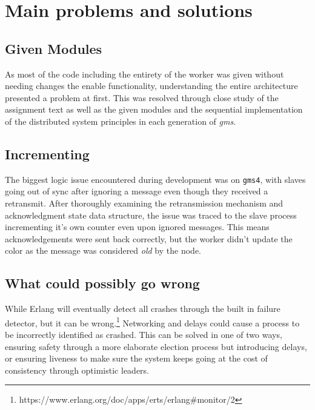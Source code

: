 \documentclass[a4paper, 11pt]{article}
\begin{document}
\section{Main problems and solutions}

\subsection{Given Modules}

As most of the code including the entirety of the worker was given without needing changes the enable functionality, understanding the entire architecture presented a problem at first.
This was resolved through close study of the assignment text as well as the given modules and the sequential implementation of the distributed system principles in each generation of \textit{gms}.

\subsection{Incrementing}

The biggest logic issue encountered during development was on \texttt{gms4}, with slaves going out of sync after ignoring a message even though they received a retransmit.
After thoroughly examining the retransmission mechanism and acknowledgment state data structure, the issue was traced to the slave process incrementing it's own counter even upon ignored messages.
This means acknowledgements were sent back correctly, but the worker didn't update the color as the message was considered \textit{old} by the node.

\subsection{What could possibly go wrong}


While Erlang will eventually detect all crashes through the built in failure detector, but it can be wrong.\footnote{https://www.erlang.org/doc/apps/erts/erlang\#monitor/2}
Networking and delays could cause a process to be incorrectly identified as crashed.
This can be solved in one of two ways, ensuring safety through a more elaborate election process but introducing delays,
or ensuring liveness to make sure the system keeps going at the cost of consistency through optimistic leaders.
\end{document}
